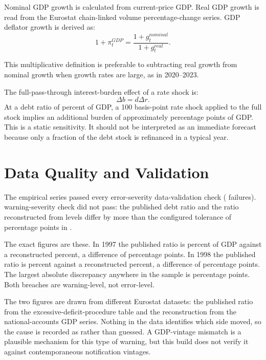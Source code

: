 \documentclass[11pt,a4paper]{article}
\begin{document}
Nominal GDP growth is calculated from current-price GDP. Real GDP growth is
read from the Eurostat chain-linked volume percentage-change series. GDP
deflator growth is derived as:
\begin{equation}
  1+\pi_t^{GDP} =
  \frac{1+g_t^{nominal}}{1+g_t^{real}}.
  \label{eq:deflator}
\end{equation}

This multiplicative definition is preferable to subtracting real growth from
nominal growth when growth rates are large, as in 2020--2023.

The full-pass-through interest-burden effect of a rate shock is:
\begin{equation}
  \Delta b = d\Delta r.
  \label{eq:shock}
\end{equation}
At a debt ratio of \LatestDebtPctGdp{} percent of GDP, a 100 basis-point rate shock applied
to the full stock implies an additional burden of approximately \ShockHundredAdditionalPp{}
percentage points of GDP. This is a static sensitivity. It should not be
interpreted as an immediate forecast because only a fraction of the debt stock
is refinanced in a typical year.

\section{Data Quality and Validation}

The empirical series passed every error-severity data-validation check
(\ValidationErrorCount{} failures). \ValidationWarningCount{} warning-severity
check did not pass: the published debt ratio and the ratio reconstructed from
levels differ by more than the configured tolerance of
\ValidationTolerancePp{} percentage points in \RatioBreachYears{}.

The exact figures are these. In 1997 the published ratio is
\DebtRatioOfficialNineteenNinetySeven{} percent of GDP against a reconstructed
\DebtRatioReconstructedNineteenNinetySeven{} percent, a difference of
\DebtRatioDifferenceNineteenNinetySevenPp{} percentage points. In 1998 the
published ratio is \DebtRatioOfficialNineteenNinetyEight{} percent against a
reconstructed \DebtRatioReconstructedNineteenNinetyEight{} percent, a
difference of \DebtRatioDifferenceNineteenNinetyEightPp{} percentage points.
The largest absolute discrepancy anywhere in the sample is
\MaxRatioDiscrepancyPp{} percentage points. Both breaches are warning-level,
not error-level.

The two figures are drawn from different Eurostat datasets: the published ratio
from the excessive-deficit-procedure table and the reconstruction from the
national-accounts GDP series. Nothing in the data identifies which side moved,
so the cause is recorded as \DebtRatioCauseNineteenNinetySeven{} rather than
guessed. A GDP-vintage mismatch is a plausible mechanism for this type of
warning, but this build does not verify it against contemporaneous notification
vintages.
\end{document}
